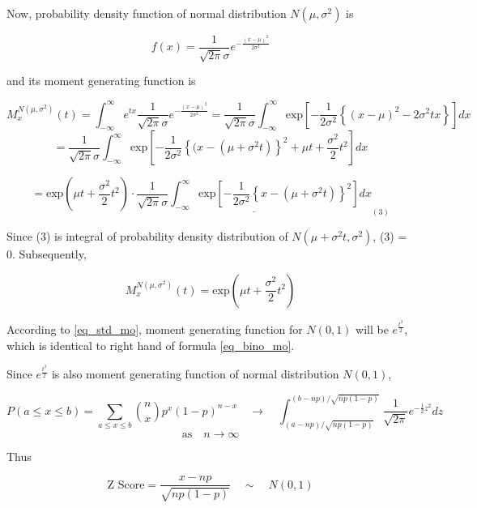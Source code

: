 \noindent
Now, probability density function of normal distribution \(N(\mu, \sigma^{2})\) is

\begin{equation}
f(x) = \frac{1}{\sqrt{2\pi}\sigma}e^{-\frac{(x-\mu)^{2}}{2\sigma^{2}}}
\end{equation}

\noindent
and its moment generating function is

\[
M_{x}^{N(\mu,\sigma^{2})}(t) = \int_{-\infty}^{\infty}e^{tx}\frac{1}{\sqrt{2\pi}\sigma}e^{-\frac{(x-\mu)^{2}}{2\sigma^{2}}}
= \frac{1}{\sqrt{2\pi}\sigma}\int_{-\infty}^{\infty}\mbox{exp}
\left[
-\frac{1}{2\sigma^{2}}\left\{(x-\mu)^{2} - 2\sigma^{2}tx\right\}
\right]
dx
\]
\[
=\frac{1}{\sqrt{2\pi}\sigma}\int_{-\infty}^{\infty}\mbox{exp}
\left[
- \frac{1}{2\sigma^{2}} 
    \left\{(x-(\mu+\sigma^{2}t)
    \right\}^{2} 
+ \mu t + \frac{\sigma^{2}}{2}t^{2}
\right]
dx
\]

\begin{equation}
=\mbox{exp}\left(\mu t + \frac{\sigma^{2}}{2}t^{2} \right) \cdot
\underline{
\frac{1}{\sqrt{2\pi}\sigma}
\int_{-\infty}^{\infty}\mbox{exp}
\left[
-\frac{1}{2\sigma^{2}}
   \left\{
      x-(\mu + \sigma^{2}t)
   \right\}^{2}
\right]dx}_{(3)}
\end{equation}

\noindent
Since (3) is integral of probability density distribution of 
\(N(\mu + \sigma^{2}t, \sigma^{2})\), (3) = 0. Subsequently,

\begin{equation}
M_{x}^{N(\mu,\sigma^{2})}(t) = \mbox{exp}\left(\mu t + \frac{\sigma^{2}}{2}t^{2} \right)
\label{eq_std_mo}
\end{equation}

According to \ref{eq_std_mo}, moment generating function for \(N(0,1)\) will be \(e^{\frac{t^{2}}{2}}\), which is identical to right hand of formula \ref{eq_bino_mo}.

\noindent
Since \(e^{\frac{t^{2}}{2}}\) is also moment generating function of normal distribution \(N(0,1)\), 

\[
P(a \leq x \leq b) = \sum_{a \leq x \leq b}{n\choose x}p^{x}(1-p)^{n-x}
\quad
\to 
\quad
\int_{(a-np)/\sqrt{np(1-p)}}^{(b-np)/\sqrt{np(1-p)}}
   \frac{1}{\sqrt{2\pi}}e^{-\frac{1}{2}z^{2}}dz
\]
\begin{equation}
\mbox{as}\quad n \to \infty
\end{equation}

\noindent
Thus

\begin{equation}
\mbox{Z Score} = \frac{x - np}{\sqrt{np(1-p)}} \quad \sim \quad N(0,1)
\label{eq_sd}
\end{equation}





